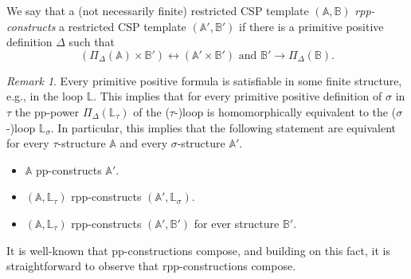 \documentclass{article}
\theoremstyle{definition}
\theoremstyle{remark}
\newtheorem{remark}[theorem]{Remark}
\newcommand{\bA}{{\mathbb A}}
\newcommand{\bB}{{\mathbb B}}
\newcommand{\bL}{{\mathbb L}}
\begin{document}
We say that a (not necessarily finite) restricted CSP template
$(\bA,\bB)$ \emph{rpp-constructs} a restricted CSP template $(\bA',\bB')$ if
there is a primitive positive definition $\Delta$  such that
\[
(\Pi_\Delta(\bA) \times \bB') \leftrightarrow  (\bA' \times \bB') \text{ and } \bB'\to \Pi_\Delta(\bB).
\]

\begin{remark}\label{rmk:pp-and-rpp}
    Every primitive positive formula is satisfiable in some finite structure, e.g., in the loop $\bL$. 
    This implies that for every primitive positive definition of $\sigma$ in $\tau$ the
    pp-power $\Pi_\Delta(\bL_\tau)$ of the ($\tau$-)loop is homomorphically equivalent to the
    ($\sigma$-)loop $\bL_\sigma$.  In particular, this implies that the following statement are
    equivalent for every $\tau$-structure $\bA$ and every $\sigma$-structure $\bA'$.
    \begin{itemize}
        \item $\bA$ pp-constructs $\bA'$.
        \item $(\bA,\bL_\tau)$ rpp-constructs $(\bA',\bL_\sigma)$.
        \item $(\bA,\bL_\tau)$ rpp-constructs $(\bA',\bB')$ for ever structure $\bB'$.
    \end{itemize}
\end{remark}


It is well-known that pp-constructions compose, and building on this fact, it is
straightforward to observe that rpp-constructions compose. 
\end{document}
